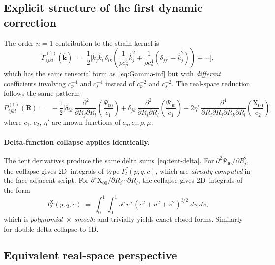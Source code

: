 \documentclass[11pt,a4paper]{article}
\newcommand{\bR}{\bm{R}}
\newcommand{\kh}{\hat{\bm{k}}}
\theoremstyle{plain}
\theoremstyle{remark}
\begin{document}
\subsection{Explicit structure of the first dynamic correction}

The order $n=1$ contribution to the strain kernel is
\begin{equation}
  \tilde{\Gamma}^{(1)}_{ijkl}(\kh)
  \;=\; \frac{1}{2}\biggl[
    \hat{k}_j\hat{k}_l\,\delta_{ik}
    \!\left(\frac{1}{\rho c_p^4}\hat{k}_j^2
    + \frac{1}{\rho c_s^4}(\delta_{jj'}-\hat{k}_j^2)\right)
    + \cdots
  \biggr],
\end{equation}
which has the same tensorial form as~\eqref{eq:Gamma-inf} but with
\emph{different} coefficients involving $c_p^{-4}$ and $c_s^{-4}$
instead of $c_p^{-2}$ and $c_s^{-2}$.  The real-space reduction
follows the same pattern:
\begin{equation}
  P^{(1)}_{ijkl}(\bR)
  \;=\;
  -\frac{1}{2}\biggl[
    \delta_{ik}\,\frac{\partial^2}{\partial R_j\partial R_l}
    \!\left(\frac{\Psi_{00}}{c_1}\right)
  + \delta_{jk}\,\frac{\partial^2}{\partial R_i\partial R_l}
    \!\left(\frac{\Psi_{00}}{c_1}\right)
  - 2\eta'\,\frac{\partial^4}{\partial R_i\partial R_j
    \partial R_k\partial R_l}
    \!\left(\frac{\mathrm{X}_{00}}{c_2}\right)
  \biggr]
  \label{eq:P1-assembly}
\end{equation}
where $c_1$, $c_2$, $\eta'$ are known functions of $c_p, c_s, \rho, \mu$.

\paragraph{Delta-function collapse applies identically.}
The tent derivatives produce the same delta sums~\eqref{eq:tent-delta}.
For $\partial^2\Psi_{00}/\partial R_j^2$, the collapse gives
2D~integrals of type $I_2^\Psi(p,q,c)$, which are \emph{already
computed} in the face-adjacent script.  For $\partial^4
\mathrm{X}_{00}/\partial R_i\cdots\partial R_l$, the collapse gives
2D~integrals of the form
\begin{equation}
  I_2^{\mathrm{X}}(p,q,c)
  \;=\;
  \int_0^1\!\int_0^1
  u^p\,v^q\,(c^2+u^2+v^2)^{3/2}\;du\,dv,
  \label{eq:I2X}
\end{equation}
which is \emph{polynomial~$\times$ smooth} and trivially yields exact
closed forms.  Similarly for double-delta collapse to 1D.

\subsection{Equivalent real-space perspective}
\end{document}
